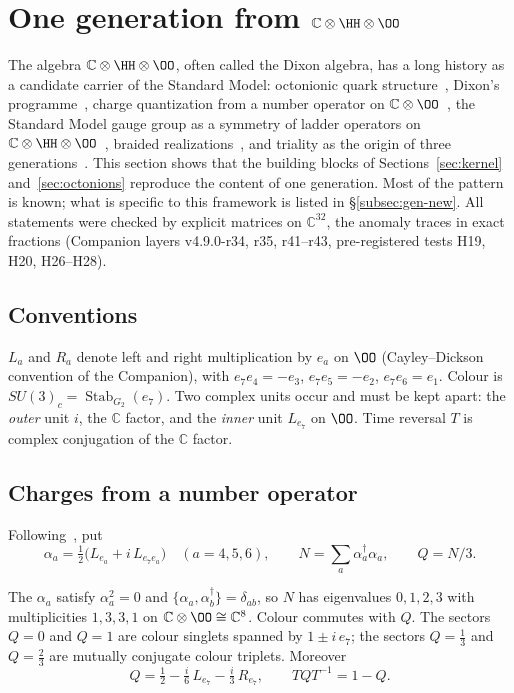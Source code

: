 \section{One generation from \texorpdfstring{$\mathbb C\otimes\HH\otimes\OO$}{C x H x O}}\label{sec:generation}

The algebra \(\mathbb C\otimes\HH\otimes\OO\), often called the Dixon algebra, has a long history as a candidate carrier of the
Standard Model: octonionic quark structure~\cite{gunaydin}, Dixon's programme~\cite{dixon}, charge quantization from a number
operator on \(\mathbb C\otimes\OO\)~\cite{furey2015}, the Standard Model gauge group as a symmetry of ladder operators on
\(\mathbb C\otimes\HH\otimes\OO\)~\cite{furey2018}, braided realizations~\cite{gresnigt}, and triality as the origin of three
generations~\cite{boyle}.  This section shows that the building blocks of Sections~\ref{sec:kernel} and~\ref{sec:octonions} reproduce
the content of one generation.  Most of the pattern is known; what is specific to this framework is listed in
\S\ref{subsec:gen-new}.  All statements were checked by explicit matrices on \(\mathbb C^{32}\), the anomaly traces in exact fractions
(Companion layers v4.9.0-r34, r35, r41--r43, pre-registered tests H19, H20, H26--H28).

\subsection{Conventions}

\(L_a\) and \(R_a\) denote left and right multiplication by \(e_a\) on \(\OO\) (Cayley--Dickson convention of the Companion), with
\(e_7e_4=-e_3\), \(e_7e_5=-e_2\), \(e_7e_6=e_1\).  Colour is \(SU(3)_c=\operatorname{Stab}_{G_2}(e_7)\).  Two complex units occur and must be
kept apart: the \emph{outer} unit \(i\), the \(\mathbb C\) factor, and the \emph{inner} unit \(L_{e_7}\) on \(\OO\).  Time reversal \(T\) is complex
conjugation of the \(\mathbb C\) factor.

\subsection{Charges from a number operator}

Following~\cite{furey2015}, put
\[
\alpha_a=\tfrac12\bigl(L_{e_a}+i\,L_{e_7e_a}\bigr)\quad(a=4,5,6),\qquad N=\sum_a\alpha_a^\dagger\alpha_a,\qquad Q=N/3 .
\]

\begin{proposition}\label{prop:charges}
The \(\alpha_a\) satisfy \(\alpha_a^2=0\) and \(\{\alpha_a,\alpha_b^\dagger\}=\delta_{ab}\), so \(N\) has eigenvalues \(0,1,2,3\) with
multiplicities \(1,3,3,1\) on \(\mathbb C\otimes\OO\cong\mathbb C^8\).  Colour commutes with \(Q\).  The sectors \(Q=0\) and \(Q=1\) are colour
singlets spanned by \(1\pm i\,e_7\); the sectors \(Q=\tfrac13\) and \(Q=\tfrac23\) are mutually conjugate colour triplets.  Moreover
\[
Q=\tfrac12-\tfrac{i}{6}\,L_{e_7}-\tfrac{i}{3}\,R_{e_7},\qquad TQT^{-1}=1-Q .
\]
\end{proposition}

